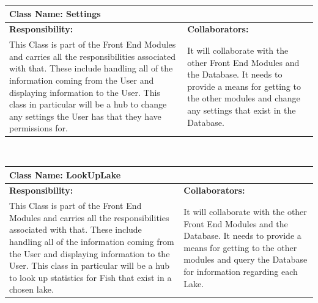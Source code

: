 \documentclass[]{article}
\begin{document}
	\begin{table}[ht]
		\centering
		\begin{tabular}{|p{5cm}|p{5cm}|}
		\hline
		 \multicolumn{2}{|l|}{\textbf{Class Name: Settings}} \\
		\hline
		\textbf{Responsibility:} & \textbf{Collaborators:} \\ \hline
		 This Class is part of the Front End Modules and carries all the responsibilities associated with that. These include handling all of the information coming from the User and displaying information to the User. This class in particular will be a hub to change any settings the User has that they have permissions for. & It will collaborate with the other Front End Modules and the Database. It needs to provide a means for getting to the other modules and change any settings that exist in the Database. \\
		\hline
		\end{tabular}
	\end{table}~\\

	\begin{table}[ht]
		\centering
		\begin{tabular}{| l | l |}
		\hline
		 \multicolumn{2}{|l|}{\textbf{Class Name: LookUpLake}} \\
		\hline
		\textbf{Responsibility:} & \textbf{Collaborators:} \\ \hline
		This Class is part of the Front End Modules and carries all the responsibilities associated with that. These include handling all of the information coming from the User and displaying information to the User. This class in particular will be a hub to look up statistics for Fish that exist in a chosen lake. & It will collaborate with the other Front End Modules and the Database. It needs to provide a means for getting to the other modules and query the Database for information regarding each Lake. \\
		\hline
		\end{tabular}
	\end{table}~\\
	\pagebreak
\end{document}
